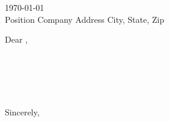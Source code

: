 \documentclass[11pt]{cv}
\begin{document}
\today\vspace{1em}\\

{Position}
{Company}
{Address}
{City, State, Zip}
\vspace{2em}

Dear \recipientname,
\vspace{1em}

\par\\
\par\\
\par\\

Sincerely,\\\\
\thename

\makefooter
\end{document}
